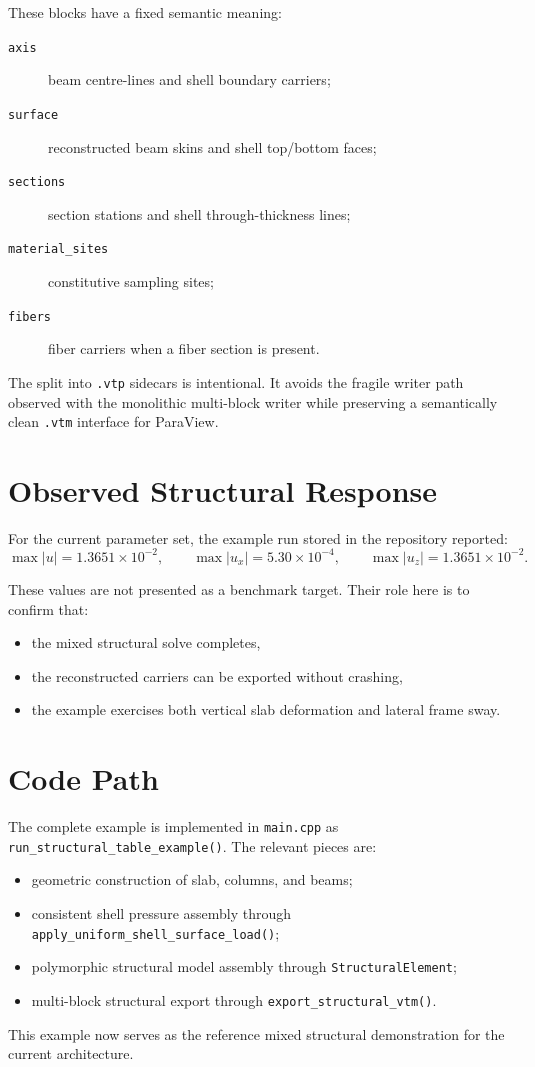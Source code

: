 These blocks have a fixed semantic meaning:
\begin{description}
  \item[\texttt{axis}] beam centre-lines and shell boundary carriers;
  \item[\texttt{surface}] reconstructed beam skins and shell top/bottom faces;
  \item[\texttt{sections}] section stations and shell through-thickness lines;
  \item[\texttt{material\_sites}] constitutive sampling sites;
  \item[\texttt{fibers}] fiber carriers when a fiber section is present.
\end{description}

The split into \texttt{.vtp} sidecars is intentional.  It avoids the fragile
writer path observed with the monolithic multi-block writer while preserving a
semantically clean \texttt{.vtm} interface for ParaView.

\section{Observed Structural Response}

For the current parameter set, the example run stored in the repository
reported:
\[
\max |u| = 1.3651\times 10^{-2}, \qquad
\max |u_x| = 5.30\times 10^{-4}, \qquad
\max |u_z| = 1.3651\times 10^{-2}.
\]

These values are not presented as a benchmark target.  Their role here is to
confirm that:
\begin{itemize}
  \item the mixed structural solve completes,
  \item the reconstructed carriers can be exported without crashing,
  \item the example exercises both vertical slab deformation and lateral frame
        sway.
\end{itemize}

\section{Code Path}

The complete example is implemented in \texttt{main.cpp} as
\texttt{run\_structural\_table\_example()}.  The relevant pieces are:
\begin{itemize}
  \item geometric construction of slab, columns, and beams;
  \item consistent shell pressure assembly through
        \texttt{apply\_uniform\_shell\_surface\_load()};
  \item polymorphic structural model assembly through
        \texttt{StructuralElement};
  \item multi-block structural export through
        \texttt{export\_structural\_vtm()}.
\end{itemize}

This example now serves as the reference mixed structural demonstration for the
current architecture.
